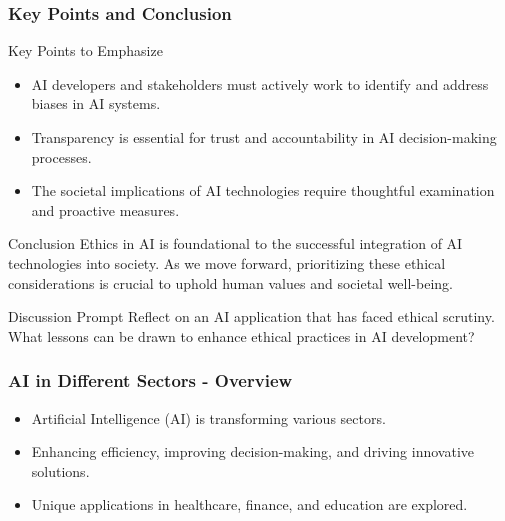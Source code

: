 \documentclass{beamer}
\begin{document}
\begin{frame}[fragile]
    \frametitle{Key Points and Conclusion}
    \begin{block}{Key Points to Emphasize}
        \begin{itemize}
            \item AI developers and stakeholders must actively work to identify and address biases in AI systems.
            \item Transparency is essential for trust and accountability in AI decision-making processes.
            \item The societal implications of AI technologies require thoughtful examination and proactive measures.
        \end{itemize}
    \end{block}

    \begin{block}{Conclusion}
        Ethics in AI is foundational to the successful integration of AI technologies into society. As we move forward, prioritizing these ethical considerations is crucial to uphold human values and societal well-being.
    \end{block}

    \begin{block}{Discussion Prompt}
        Reflect on an AI application that has faced ethical scrutiny. What lessons can be drawn to enhance ethical practices in AI development?
    \end{block}
\end{frame}

\begin{frame}[fragile]
    \frametitle{AI in Different Sectors - Overview}
    \begin{itemize}
        \item Artificial Intelligence (AI) is transforming various sectors.
        \item Enhancing efficiency, improving decision-making, and driving innovative solutions.
        \item Unique applications in healthcare, finance, and education are explored.
    \end{itemize}
\end{frame}
\end{document}
